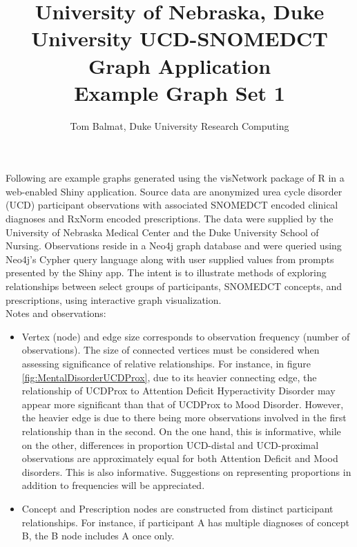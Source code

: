 \documentclass[10pt, letterpaper]{article}
\title{\large University of Nebraska, Duke University UCD-SNOMEDCT Graph Application\\[8pt]
       \large Example Graph Set 1}
\date{}
\author{\normalsize Tom Balmat, Duke University Research Computing}
\begin{document}
    
\begin{spacing}{1.0}
    
\maketitle


Following are example graphs generated using the visNetwork package of R in a web-enabled Shiny application.  Source data are anonymized urea cycle disorder (UCD) participant observations with associated SNOMEDCT encoded clinical diagnoses and RxNorm encoded prescriptions.  The data were supplied by the University of Nebraska Medical Center and the Duke University School of Nursing.  Observations reside in a Neo4j graph database and were queried using Neo4j's Cypher query language along with user supplied values from prompts presented by the Shiny app.  The intent is to illustrate methods of exploring relationships between select groups of participants, SNOMEDCT concepts, and prescriptions, using interactive graph visualization.\\

Notes and observations:
\begin{itemize}

    \item  Vertex (node) and edge size corresponds to observation frequency (number of observations). The size of connected vertices must be considered when assessing significance of relative relationships.  For instance, in figure \ref{fig:MentalDisorderUCDProx}, due to its heavier connecting edge, the relationship of UCDProx to Attention Deficit Hyperactivity Disorder may appear more significant than that of UCDProx to Mood Disorder.  However, the heavier edge is due to there being more observations involved in the first relationship than in the second.  On the one hand, this is informative, while on the other, differences in proportion UCD-distal and UCD-proximal observations are approximately equal for both Attention Deficit and Mood disorders.  This is also informative.  Suggestions on representing proportions in addition to frequencies will be appreciated.
    
    \item Concept and Prescription nodes are constructed from distinct participant relationships.  For instance, if participant A has multiple diagnoses of concept B, the B node includes A once only.


\end{itemize}
\end{spacing}
\end{document}
